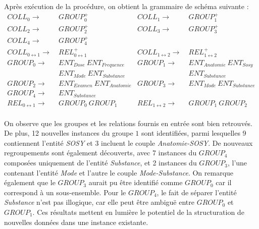Après exécution de la procédure, on obtient la grammaire de schéma suivante :
\begin{align*}
    COLL_0                     \to & ~ GROUP_0^+                     & COLL_1                     \to & ~ GROUP_1^+                    \\
    COLL_2                     \to & ~ GROUP_2^+                     & COLL_3                     \to & ~ GROUP_3^+                    \\
    COLL_4                     \to & ~ GROUP_4^+                                                                                       \\
    COLL_{0 \leftrightarrow 1} \to & ~ REL_{0 \leftrightarrow 1}^+   & COLL_{1 \leftrightarrow 2} \to & ~ REL_{1 \leftrightarrow 2}^+  \\
    GROUP_0                    \to & ~ ENT_{Dose} ~ ENT_{Frequence}  & GROUP_1                    \to & ~ ENT_{Anatomie} ~ ENT_{Sosy}  \\
                                   & ~ ENT_{Mode} ~ ENT_{Substance}  &                                & ~ ENT_{Substance}              \\
    GROUP_2                    \to & ~ ENT_{Examen} ~ ENT_{Anatomie} & GROUP_3                    \to & ~ ENT_{Mode} ~ ENT_{Substance} \\
    GROUP_4                    \to & ~ ENT_{Substance}                                                                                 \\
    REL_{0 \leftrightarrow 1}  \to & ~ GROUP_0 ~ GROUP_1             & REL_{1 \leftrightarrow 2}  \to & ~ GROUP_1 ~ GROUP_2
\end{align*}

\paragraph{}
On observe que les groupes et les relations fournis en entrée sont bien retrouvés.
De plus, \num{12} nouvelles instances du groupe $1$ sont identifiées, parmi lesquelles \num{9} contiennent l'entité \emph{SOSY} et \num{3} incluent le couple \emph{Anatomie-SOSY}.
De nouveaux regroupements sont également découverts, avec \num{7} instances du $GROUP_4$ composées uniquement de l'entité \emph{Substance}, et \num{2} instances du $GROUP_3$, l'une contenant l'entité \emph{Mode} et l'autre le couple \emph{Mode-Substance}.
On remarque également que le $GROUP_3$ aurait pu être identifié comme $GROUP_0$ car il correspond à un sous-ensemble.
Pour le $GROUP_4$, le fait de séparer l'entité \emph{Substance} n'est pas illogique, car elle peut être ambiguë entre $GROUP_0$ et $GROUP_1$.
Ces résultats mettent en lumière le potentiel de la structuration de nouvelles données dans une instance existante.

\FloatBarrier
